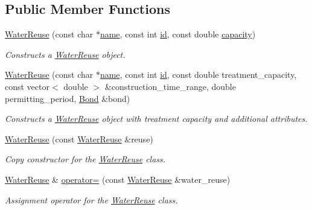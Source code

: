 \subsection*{Public Member Functions}
\begin{DoxyCompactItemize}
\item 
\mbox{\hyperlink{classWaterReuse_a0493da65856f50fad2bc2d2c087f378f}{Water\+Reuse}} (const char $\ast$\mbox{\hyperlink{classWaterSource_a846ea74c5b453d014f594d41fee8c765}{name}}, const int \mbox{\hyperlink{classWaterSource_a6eafe5dfefd317877d1244e8a7c6e742}{id}}, const double \mbox{\hyperlink{classWaterSource_a2ec257b415b248214a8bce7fc5267723}{capacity}})
\begin{DoxyCompactList}\small\item\em Constructs a \mbox{\hyperlink{classWaterReuse}{Water\+Reuse}} object. \end{DoxyCompactList}\item 
\mbox{\hyperlink{classWaterReuse_a107ecd54d6fd705f0c31e57de21914e1}{Water\+Reuse}} (const char $\ast$\mbox{\hyperlink{classWaterSource_a846ea74c5b453d014f594d41fee8c765}{name}}, const int \mbox{\hyperlink{classWaterSource_a6eafe5dfefd317877d1244e8a7c6e742}{id}}, const double treatment\+\_\+capacity, const vector$<$ double $>$ \&construction\+\_\+time\+\_\+range, double permitting\+\_\+period, \mbox{\hyperlink{classBond}{Bond}} \&bond)
\begin{DoxyCompactList}\small\item\em Constructs a \mbox{\hyperlink{classWaterReuse}{Water\+Reuse}} object with treatment capacity and additional attributes. \end{DoxyCompactList}\item 
\mbox{\hyperlink{classWaterReuse_abe522bfe68c8b0bd05c4e608f3f6e6ba}{Water\+Reuse}} (const \mbox{\hyperlink{classWaterReuse}{Water\+Reuse}} \&reuse)
\begin{DoxyCompactList}\small\item\em Copy constructor for the \mbox{\hyperlink{classWaterReuse}{Water\+Reuse}} class. \end{DoxyCompactList}\item 
\mbox{\hyperlink{classWaterReuse}{Water\+Reuse}} \& \mbox{\hyperlink{classWaterReuse_ab0a905840bfc092d9bf9f69e94262948}{operator=}} (const \mbox{\hyperlink{classWaterReuse}{Water\+Reuse}} \&water\+\_\+reuse)
\begin{DoxyCompactList}\small\item\em Assignment operator for the \mbox{\hyperlink{classWaterReuse}{Water\+Reuse}} class. \end{DoxyCompactList}\item 

\end{DoxyCompactItemize}
